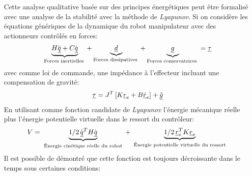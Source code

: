 Cette analyse qualitative basée sur des principes énergétiques peut être formalisé avec une analyse de la stabilité avec la méthode de \textit{Lyapunov}. Si on considère les équations génériques de la dynamique du robot manipulateur avec des actionneurs contrôlés en forces:
\begin{align}
\underbrace{
H \ddot{\underline{q}} + C \dot{\underline{q}} 
}_{\text{Forces inertielles }}
+ 
\underbrace{
\underline{d}
}_{\text{Forces dissipatives }}
+ 
\underbrace{
\underline{g} 
}_{\text{Forces conservatrices }}
= \underline{\tau}
\end{align}
avec comme loi de commande, une impédance à l'effecteur incluant une compensation de gravité:
\begin{align}
\underline{\tau} = J^T   \left[ K \underline{r}_e + B \underline{\dot{r}}_e \right] + \underline{\hat{g}}
\end{align}
En utilisant comme fonction candidate de \textit{Lyapunov} l'énergie mécanique réelle plus l'énergie potentielle virtuelle dans le ressort du contrôleur:
\begin{align}
V = 
\underbrace{
1/2 \, \dot{\underline{q}}^T H \dot{\underline{q}} 
}_{\text{ Énergie cinétique réelle du robot }}
+
\underbrace{
1/2 \, \underline{r}_e^T K \underline{r}_e
}_{\text{ Énergie potentielle virtuelle du ressort }}
\end{align}
Il est possible de démontré que cette fonction est toujours décroissante dans le temps sous certaines conditions:

